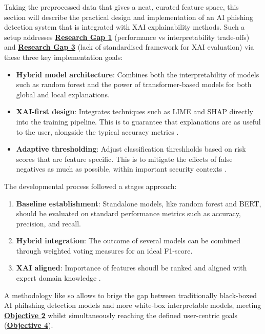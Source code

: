 
Taking the preprocessed data that gives a neat, curated feature space, this section will describe the practical design and implementation of an AI phishing detection system that is integrated with XAI explainability methods. Such a setup addresses \hyperref[research-gap-1]{\uline{\textbf{Research Gap 1}}} (performance vs interpretability trade-offs) and \hyperref[research-gap-3]{\uline{\textbf{Research Gap 3}}} (lack of standardised framework for XAI evaluation) via these three key implementation goals:

\begin{itemize}
  \item \textbf{Hybrid model architecture}: Combines both the interpretability of models such as random forest and the power of transformer-based models \citep{shirazi2022towards} for both global and local explanations.
  \item \textbf{XAI-first design}: Integrates techniques such as LIME and SHAP directly into the training pipeline. This is to guarantee that explanations are as useful to the user, alongside the typical accuracy metrics \citep{shendkar2024enhancing}.
  \item \textbf{Adaptive thresholding}: Adjust classification threshholds based on risk scores that are feature specific. This is to mitigate the effects of false negatives as much as possible, within important security contexts \citep{atlam2022business}.
\end{itemize}

\noindent The developmental process followed a stages approach:

\begin{enumerate}
  \item \textbf{Baseline establishment}: Standalone models, like random forest and BERT, should be evaluated on standard performance metrics such as accuracy, precision, and recall.
  \item \textbf{Hybrid integration}: The outcome of several models can be combined through weighted voting measures for an ideal F1-score.
  \item \textbf{XAI aligned}: Importance of features shoudl be ranked and aligned with expert domain knowledge \citep{greco2023explaining}.
\end{enumerate}

\noindent A methodology like so allows to brige the gap between traditionally black-boxed AI phihshing detection models and more white-box interpretable models, meeting \hyperref[objective-2]{\uline{\textbf{Objective 2}}} whilst simultaneously reaching the defined user-centric goals (\hyperref[objective-4]{\uline{\textbf{Objective 4}}}).
